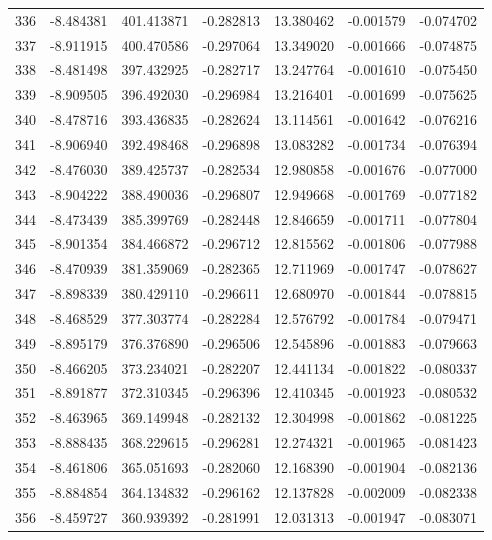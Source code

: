 \begin{tabular}{rrrrrrr}
 336 &  -8.484381 &  401.413871 & -0.282813 &  13.380462 &  -0.001579 & -0.074702 \\
 337 &  -8.911915 &  400.470586 & -0.297064 &  13.349020 &  -0.001666 & -0.074875 \\
 338 &  -8.481498 &  397.432925 & -0.282717 &  13.247764 &  -0.001610 & -0.075450 \\
 339 &  -8.909505 &  396.492030 & -0.296984 &  13.216401 &  -0.001699 & -0.075625 \\
 340 &  -8.478716 &  393.436835 & -0.282624 &  13.114561 &  -0.001642 & -0.076216 \\
 341 &  -8.906940 &  392.498468 & -0.296898 &  13.083282 &  -0.001734 & -0.076394 \\
 342 &  -8.476030 &  389.425737 & -0.282534 &  12.980858 &  -0.001676 & -0.077000 \\
 343 &  -8.904222 &  388.490036 & -0.296807 &  12.949668 &  -0.001769 & -0.077182 \\
 344 &  -8.473439 &  385.399769 & -0.282448 &  12.846659 &  -0.001711 & -0.077804 \\
 345 &  -8.901354 &  384.466872 & -0.296712 &  12.815562 &  -0.001806 & -0.077988 \\
 346 &  -8.470939 &  381.359069 & -0.282365 &  12.711969 &  -0.001747 & -0.078627 \\
 347 &  -8.898339 &  380.429110 & -0.296611 &  12.680970 &  -0.001844 & -0.078815 \\
 348 &  -8.468529 &  377.303774 & -0.282284 &  12.576792 &  -0.001784 & -0.079471 \\
 349 &  -8.895179 &  376.376890 & -0.296506 &  12.545896 &  -0.001883 & -0.079663 \\
 350 &  -8.466205 &  373.234021 & -0.282207 &  12.441134 &  -0.001822 & -0.080337 \\
 351 &  -8.891877 &  372.310345 & -0.296396 &  12.410345 &  -0.001923 & -0.080532 \\
 352 &  -8.463965 &  369.149948 & -0.282132 &  12.304998 &  -0.001862 & -0.081225 \\
 353 &  -8.888435 &  368.229615 & -0.296281 &  12.274321 &  -0.001965 & -0.081423 \\
 354 &  -8.461806 &  365.051693 & -0.282060 &  12.168390 &  -0.001904 & -0.082136 \\
 355 &  -8.884854 &  364.134832 & -0.296162 &  12.137828 &  -0.002009 & -0.082338 \\
 356 &  -8.459727 &  360.939392 & -0.281991 &  12.031313 &  -0.001947 & -0.083071 \\

\end{tabular}
